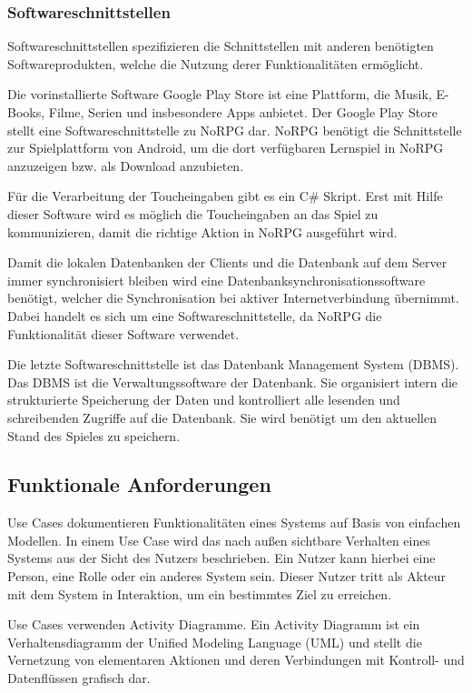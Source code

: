 		\subsubsection{Softwareschnittstellen}
			Softwareschnittstellen spezifizieren die Schnittstellen mit anderen benötigten Softwareprodukten, welche die Nutzung derer Funktionalitäten ermöglicht.
			
			Die vorinstallierte Software Google Play Store ist eine Plattform, die Musik, E-Books, Filme, Serien und insbesondere Apps anbietet. Der Google Play Store stellt eine Softwareschnittstelle zu NoRPG dar. NoRPG benötigt die Schnittstelle zur Spielplattform von Android, um die dort verfügbaren Lernspiel in NoRPG anzuzeigen bzw. als Download anzubieten.
			
			Für die Verarbeitung der Toucheingaben gibt es ein C\# Skript. Erst mit Hilfe dieser Software wird es möglich die Toucheingaben an das Spiel zu kommunizieren, damit die richtige Aktion in NoRPG ausgeführt wird.
			
			Damit die lokalen Datenbanken der Clients und die Datenbank auf dem Server immer synchronisiert bleiben wird eine Datenbanksynchronisationssoftware benötigt, welcher die Synchronisation bei aktiver Internetverbindung übernimmt. Dabei handelt es sich um eine Softwareschnittstelle, da NoRPG die Funktionalität dieser Software verwendet.
			
			Die letzte Softwareschnittstelle ist das Datenbank Management System (DBMS). Das DBMS ist die Verwaltungssoftware der Datenbank. Sie organisiert intern die strukturierte Speicherung der Daten und kontrolliert alle lesenden und schreibenden Zugriffe auf die Datenbank. Sie wird benötigt um den aktuellen Stand des Spieles zu speichern.

	\subsection{Funktionale Anforderungen}
		Use Cases dokumentieren Funktionalitäten eines Systems auf Basis von einfachen Modellen. In einem Use Case wird das nach außen sichtbare Verhalten eines Systems aus der Sicht des Nutzers beschrieben. Ein Nutzer kann hierbei eine Person, eine Rolle oder ein anderes System sein. Dieser Nutzer tritt als Akteur mit dem System in Interaktion, um ein bestimmtes Ziel zu erreichen.
		
		Use Cases verwenden Activity Diagramme. Ein Activity Diagramm ist ein Verhaltensdiagramm der Unified Modeling Language (UML) und stellt die Vernetzung von elementaren Aktionen und deren Verbindungen mit Kontroll- und Datenflüssen grafisch dar.
	

